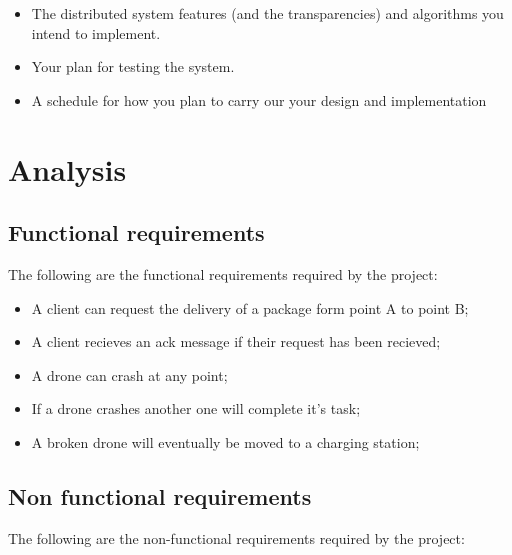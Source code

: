 \documentclass{memoir}
\begin{document}
\begin{itemize}
\item The distributed system features (and the transparencies) and algorithms you intend to implement.
\item Your plan for testing the system.
\item A schedule for how you plan to carry our your design and implementation
\end{itemize}



\chapter{Analysis}\label{ch:analysis}


\section{Functional requirements}
The following are the functional requirements required by the project:
\begin{itemize}
\item A client can request the delivery of a package form point A to point B;
\item A client recieves an ack message if their request has been recieved;
\item A drone can crash at any point;
\item If a drone crashes another one will complete it's task;
\item A broken drone will eventually be moved to a charging station;
\end{itemize}

\section{Non functional requirements}
The following are the non-functional requirements required by the project:
\begin{itemize}

\end{itemize}
\end{document}
